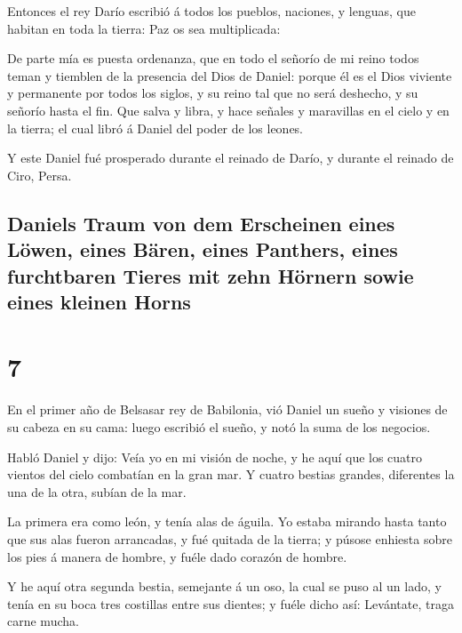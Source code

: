  Entonces el rey Darío escribió á todos los pueblos,
naciones, y lenguas, que habitan en toda la tierra: Paz os sea
multiplicada:

 De parte mía es puesta ordenanza, que en todo el señorío
de mi reino todos teman y tiemblen de la presencia del Dios de Daniel:
porque él es el Dios viviente y permanente por todos los siglos, y su
reino tal que no será deshecho, y su señorío hasta el fin.
 Que salva y libra, y hace señales y maravillas en el
cielo y en la tierra; el cual libró á Daniel del poder de los leones.

 Y este Daniel fué prosperado durante el reinado de
Darío, y durante el reinado de Ciro, Persa.

\hypertarget{daniels-traum-von-dem-erscheinen-eines-luxf6wen-eines-buxe4ren-eines-panthers-eines-furchtbaren-tieres-mit-zehn-huxf6rnern-sowie-eines-kleinen-horns}{%
\subsection{Daniels Traum von dem Erscheinen eines Löwen, eines Bären,
eines Panthers, eines furchtbaren Tieres mit zehn Hörnern sowie eines
kleinen
Horns}\label{daniels-traum-von-dem-erscheinen-eines-luxf6wen-eines-buxe4ren-eines-panthers-eines-furchtbaren-tieres-mit-zehn-huxf6rnern-sowie-eines-kleinen-horns}}

\hypertarget{section-6}{%
\section{7}\label{section-6}}

 En el primer año de Belsasar rey de Babilonia, vió Daniel
un sueño y visiones de su cabeza en su cama: luego escribió el sueño, y
notó la suma de los negocios.

 Habló Daniel y dijo: Veía yo en mi visión de noche, y he
aquí que los cuatro vientos del cielo combatían en la gran mar.
 Y cuatro bestias grandes, diferentes la una de la otra,
subían de la mar.

 La primera era como león, y tenía alas de águila. Yo
estaba mirando hasta tanto que sus alas fueron arrancadas, y fué quitada
de la tierra; y púsose enhiesta sobre los pies á manera de hombre, y
fuéle dado corazón de hombre.

 Y he aquí otra segunda bestia, semejante á un oso, la
cual se puso al un lado, y tenía en su boca tres costillas entre sus
dientes; y fuéle dicho así: Levántate, traga carne mucha.

